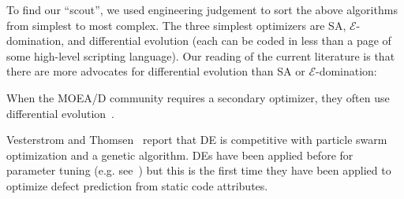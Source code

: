 To find our ``scout'',  we used engineering judgement to sort  the above algorithms from simplest to most complex.
The three simplest optimizers are SA, $\mathcal{E}$-domination, and 
differential evolution (each can be coded in less than a page of some high-level scripting language). Our reading of the current literature is that there are more  advocates for
differential evolution than
  SA or $\mathcal{E}$-domination:
  \bi
  \item
  When the MOEA/D community requires a secondary optimizer, they often use  differential evolution~\cite{zhang07,5583335}.
  \item
 Vesterstrom and Thomsen~\cite{Vesterstrom04} report that DE is competitive with 
   particle swarm optimization and a genetic algorithm. 
   \ei
DEs have been applied before for   parameter tuning (e.g. see~\cite{omran2005differential, chiha2012tuning}) but this is the first time they have been applied to
optimize defect prediction from static code attributes.  


 
 

 